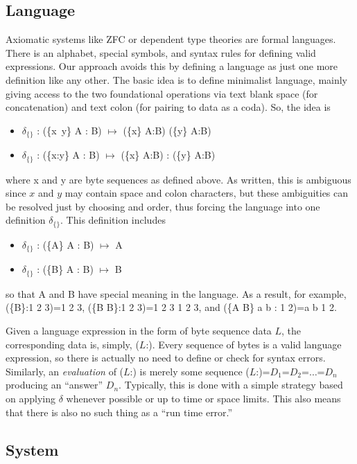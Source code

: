 \documentclass[11pt]{article}
\begin{document}
\subsection{Language} 

Axiomatic systems like ZFC\cite{ZFC} or dependent type theories\cite{types,hott} are formal languages.  There is an alphabet, special symbols, and syntax rules 
for defining valid expressions.  Our approach avoids this by defining a language as just one more definition like any other.  The basic idea is to 
define minimalist language, mainly giving access to the two foundational operations via text blank space (for concatenation) and text colon (for pairing to data as a coda).  So, the idea is 
\begin{itemize}
\item {$\delta_{\{\}}$ : (\{x\ y\} A : B) $\mapsto$ (\{x\} A:B) (\{y\} A:B)}
\item {$\delta_{\{\}}$ : (\{x:y\} A : B) $\mapsto$ (\{x\} A:B) : (\{y\} A:B)}
\end{itemize}
where x and y are byte sequences as defined above.  As written, this is ambiguous since $x$ and $y$ may contain space and colon characters, but 
these ambiguities can be resolved just by choosing and order, thus forcing the language into one definition 
$\delta_{\{\}}$.  This definition includes 
\begin{itemize}
\item {$\delta_{\{\}}$ : (\{A\} A : B) $\mapsto$ A}
\item {$\delta_{\{\}}$ : (\{B\} A : B) $\mapsto$ B}
\end{itemize}
so that A and B have special meaning in the language.  As a result, for example, (\{B\}:1 2 3)=1 2 3, (\{B B\}:1 2 3)=1 2 3 1 2 3, and (\{A B\} a b : 1 2)=a b 1 2.  

     Given a language expression in the form of byte sequence data $L$, the corresponding data is, simply, ($L$:).  Every sequence of bytes is a valid language 
expression, so there is actually no need to define or check for syntax errors.  Similarly, an {\it evaluation} of ($L$:) is merely some sequence 
($L$:)=$D_1$=$D_2$=$\dots$=$D_n$ producing an ``answer'' $D_n$.  Typically, this is done with a simple strategy based on applying $\delta$ whenever 
possible or up to time or space limits.  This also means that there is also no such thing as a ``run time error.''    

\subsection{System} 
\end{document}

